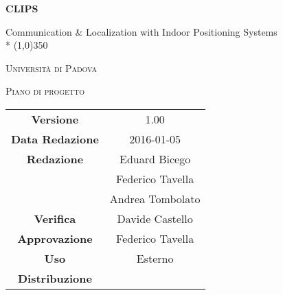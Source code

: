 \documentclass[a4paper,12pt]{article}
\author{Eduard Bicego, Federico Tavella, Andrea Tombolato}
\date{05/01/2016}
\begin{document}
	\begin{titlepage}
		\centering
		{\huge\bfseries CLIPS\par}
		Communication \& Localization with Indoor Positioning Systems \\*
		\line(1,0){350} \\
		{\scshape\LARGE Università di Padova \par}
		\vspace{1cm}
		{\scshape\Large Piano di progetto\par}
		\vspace{2cm}
		\logo
	
		\vfill \vfill
		\begin{tabular}{c|c}
			{\hfill \textbf{Versione}} 			& 1.00				\\
			{\hfill\textbf{Data Redazione}} 	& 2016-01-05  		\\
			{\hfill\textbf{Redazione}} 			& Eduard Bicego  	\\ 
												& Federico Tavella	\\
												& Andrea Tombolato	\\
			{\hfill\textbf{Verifica}} 			& Davide Castello 	\\
			{\hfill\textbf{Approvazione}} 		& Federico Tavella	\\
			{\hfill\textbf{Uso}} 				& Esterno			\\
			{\hfill\textbf{Distribuzione}} 		& \leaf				\\
	\end{tabular}
\end{titlepage}
	
	\newpage
		
	\newpage
		\tableofcontents 	%
	\newpage
		\listoftables 		%
	\newpage	
		\listoffigures		%
	
	\label{LastFrontPage}

	\newpage
		\pagestyle{mymain}
	
	\newpage
		
	\newpage
		

	\newpage
		
		
	\newpage
		
		
	\newpage
			
		
	\newpage
			

    \newpage
		
		
	\newpage
		
        
    \newpage
		
		
	\label{LastPage}
\end{document}
